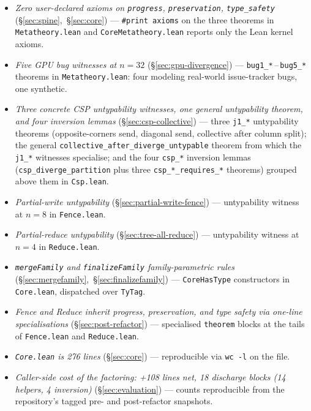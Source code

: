 \documentclass[acmsmall,screen,review,anonymous,nonacm]{acmart}
\begin{document}
\begin{itemize}\small
\item \textit{Zero user-declared axioms on \texttt{progress}, \texttt{preservation}, \texttt{type\_safety}} (\S\ref{sec:spine},~\S\ref{sec:core}) --- \texttt{\#print axioms} on the three theorems in \texttt{Metatheory.lean} and \texttt{CoreMetatheory.lean} reports only the Lean kernel axioms.
\item \textit{Five GPU bug witnesses at \(n=32\)} (\S\ref{sec:gpu-divergence}) --- \texttt{bug1\_*}\,--\,\texttt{bug5\_*} theorems in \texttt{Metatheory.lean}: four modeling real-world issue-tracker bugs, one synthetic.
\item \textit{Three concrete CSP untypability witnesses, one general untypability theorem, and four inversion lemmas} (\S\ref{sec:csp-collective}) --- three \texttt{j1\_*} untypability theorems (opposite-corners send, diagonal send, collective after column split); the general \texttt{collective\_after\_diverge\_untypable} theorem from which the \texttt{j1\_*} witnesses specialise; and the four \texttt{csp\_*} inversion lemmas (\texttt{csp\_diverge\_partition} plus three \texttt{csp\_*\_requires\_*} theorems) grouped above them in \texttt{Csp.lean}.
\item \textit{Partial-write untypability} (\S\ref{sec:partial-write-fence}) --- untypability witness at \(n=8\) in \texttt{Fence.lean}.
\item \textit{Partial-reduce untypability} (\S\ref{sec:tree-all-reduce}) --- untypability witness at \(n=4\) in \texttt{Reduce.lean}.
\item \textit{\texttt{mergeFamily} and \texttt{finalizeFamily} family-parametric rules} (\S\ref{sec:mergefamily},~\S\ref{sec:finalizefamily}) --- \texttt{CoreHasType} constructors in \texttt{Core.lean}, dispatched over \texttt{TyTag}.
\item \textit{Fence and Reduce inherit progress, preservation, and type safety via one-line specialisations} (\S\ref{sec:post-refactor}) --- specialised \texttt{theorem} blocks at the tails of \texttt{Fence.lean} and \texttt{Reduce.lean}.
\item \textit{\texttt{Core.lean} is 276 lines} (\S\ref{sec:core}) --- reproducible via \texttt{wc -l} on the file.
\item \textit{Caller-side cost of the factoring: +108 lines net, 18 discharge blocks (14 helpers, 4 inversion)} (\S\ref{sec:evaluation}) --- counts reproducible from the repository's tagged pre- and post-refactor snapshots.
\end{itemize}
\end{document}
